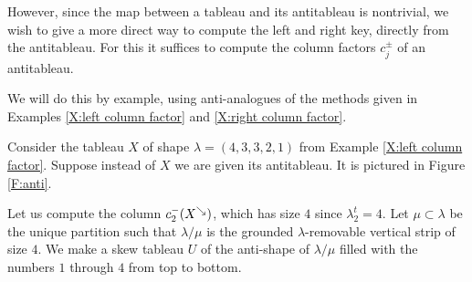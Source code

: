 \documentclass{ert-l} %
\begin{document}
However, since the map between a tableau and its antitableau is nontrivial, we wish
to give a more direct way to compute the left and right key, directly from the antitableau.
For this it suffices to compute the column factors $c_j^\pm$ of an antitableau.

We will do this by example, using anti-analogues of the methods given in
Examples \ref{X:left column factor} and \ref{X:right column factor}.
	
\begin{example} \label{X:anti left column factor}
Consider the tableau $X$ of shape $\lambda=(4,3,3,2,1)$ from Example \ref{X:left column factor}. Suppose instead of $X$ we are given its antitableau. It is pictured in Figure \ref{F:anti}.

Let us compute the column $c_2^-(X^\searrow)$, which has size $4$ since $\lambda^t_2=4$.
Let $\mu\subset\lambda$ be the unique partition such that $\lambda/\mu$ is the grounded $\lambda$-removable vertical strip of size $4$. We make a skew tableau $U$ of the anti-shape of $\lambda/\mu$ filled with the numbers $1$ through $4$ from top to bottom.


\end{example}
\end{document}
